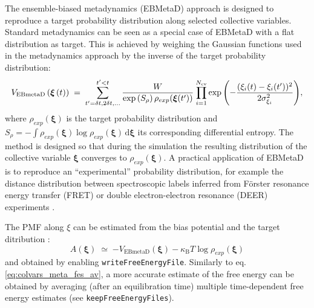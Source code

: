The ensemble-biased metadynamics (EBMetaD) approach \cite{Marinelli2015} is designed to reproduce a target probability distribution along selected collective variables.
Standard metadynamics can be seen as a special case of EBMetaD with a flat distribution as target.
This is achieved by weighing the Gaussian functions used in the metadynamics approach by the inverse of the target probability distribution:
\begin{equation}
  \label{eq:colvars_ebmeta_pot}
  V_{\mathrm{EBmetaD}}\left({\mbox{\boldmath{$\xi$}}}\left(t\right)\right) \; = \; {
    \sum_{t' = \delta{}t, \\ 2\delta{}t, \\ \ldots}^{t'<t} \frac{W}{\exp\left(S_{\rho}\right)\rho_{exp}({\mbox{\boldmath{$\xi$}}}(t'))} \: {
      \prod_{i = 1}^{N_{\mathrm{cv}}}
      \exp\left(-\frac{(\xi_{i}(t)-\xi_{i}(t'))^{2}}{2\sigma_{\xi_{i}}^{2}}\right)
    }
  }\mathrm{,}
\end{equation}
where $\rho_{exp}(\bm{\xi})$ is the target probability distribution and $S_{\rho} = - \int  \rho_{exp}(\bm{\xi}) \log \rho_{exp}(\bm{\xi})  \, \mathrm{d}\bm{\xi}$ its corresponding differential entropy.
The method is designed so that during the simulation the resulting distribution of the collective variable $\bm{\xi}$ converges to $\rho_{exp}(\bm{\xi})$.
A practical application of EBMetaD is to reproduce an ``experimental'' probability distribution, for example the distance distribution between spectroscopic labels inferred from F\"orster resonance energy transfer (FRET) or double electron-electron resonance (DEER) experiments \cite{Marinelli2015}.

The PMF along $\xi$ can be estimated from the bias potential and the target ditribution \cite{Marinelli2015}:
\begin{equation}
  \label{eq:colvars_ebmeta_fes}
  A(\bm{\xi}) \; \simeq \; {
    -V_{\mathrm{EBmetaD}}(\bm{\xi}) - \kappa_{\mathrm{B}}T \log \rho_{exp}(\bm{\xi})
  }
\end{equation}
and obtained by enabling \texttt{writeFreeEnergyFile}.
Similarly to eq.{} \ref{eq:colvars_meta_fes_av}, a more accurate estimate of the free energy can be obtained by averaging (after an equilibration time) multiple time-dependent free energy estimates (see \texttt{keepFreeEnergyFiles}).

